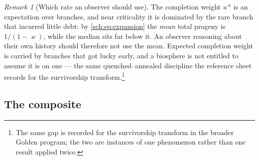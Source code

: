 \documentclass[11pt]{article}
\theoremstyle{plain}
\theoremstyle{definition}
\theoremstyle{remark}
\newtheorem{remark}[theorem]{Remark}
\begin{document}
\begin{remark}[Which rate an observer should use]\label{sch:rem:gap2}
The completion weight $u^{\,n}$ is an expectation over branches, and
near criticality it is dominated by the rare branch that incurred little
debt: by \eqref{sch:eq:expansion} the \emph{mean} total progeny is
$1/(1-\varkappa)$, while the median sits far below it. An observer reasoning
about their own history should therefore not use the mean. Expected
completion weight is carried by branches that got lucky early, and a
biosphere is not entitled to assume it is on one --- the same
quenched--annealed discipline the reference sheet records for the
survivorship transform.\footnote{The same gap is recorded for the survivorship transform in the broader Golden program; the two are instances of one phenomenon rather than one result applied twice.}
\end{remark}

\subsection{The composite}\label{sch:subsub:composite}
\end{document}
